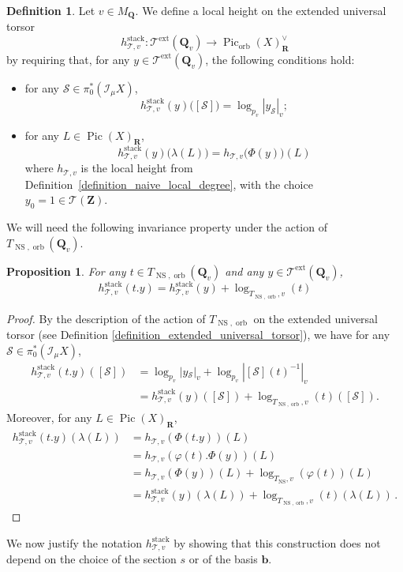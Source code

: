\documentclass{proc-l}
\newcommand{\R}{\mathbf{R}}
\newcommand{\Z}{\mathbf{Z}}
\newcommand{\Q}{\mathbf{Q}}
\newcommand{\base}{\mathbf{b}}
\DeclareMathOperator{\Pic}{Pic}
\DeclareMathOperator{\stack}{stack}
\DeclareMathOperator{\NS}{NS}
\DeclareMathOperator{\orb}{orb}
\DeclareMathOperator{\ext}{ext}
\newcommand{\stackS}{\mathcal{S}}
\newcommand{\stackT}{\mathcal{T}}
\newcommand{\sheafI}{\mathcal{I}}
\newcommand{\twistsector}{\pi_0^*(\sheafI_{\mu} X)}
\newtheorem{prop}[theorem]{Proposition}
\theoremstyle{definition}
\newtheorem{definition}[theorem]{Definition}
\theoremstyle{remark}
\numberwithin{equation}{section}
\begin{document}
\begin{definition}\label{definition_lift_free_picard_stacky_height}
Let $v \in M_{\Q}$. We define a local height on the extended universal torsor
\[
h_{\stackT,v}^{\stack} : \stackT^{\ext}(\Q_v) \longrightarrow \Pic_{\orb}(X)^{\vee}_{\R}
\]
by requiring that, for any $y \in \stackT^{\ext}(\Q_v)$, the following conditions hold:
\begin{itemize}
\item
for any $\stackS \in \twistsector$,
\[
h_{\stackT,v}^{\stack}(y)\bigl([\stackS]\bigr)
=
\log_{p_v} \left| y_{\stackS} \right|_v;
\]
\item
for any $L \in \Pic(X)_{\R}$,
\[
h_{\stackT,v}^{\stack}(y)\bigl(\lambda(L)\bigr)
=
h_{\stackT,v}\bigl(\Phi(y)\bigr)(L)
\]where $h_{\stackT,v}$ is the local height from Definition~\ref{definition_naive_local_degree}, with the choice \\ $y_0 = 1 \in \stackT(\Z)$.
\end{itemize}
\end{definition}

We will need the following invariance property under the action of $T_{\NS,\orb}(\Q_v)$.

\begin{prop}\label{proposition_appendix_B_property_equivariant_extended_height}
    For any $t \in T_{\NS,\orb}(\Q_v)$ and any $y \in \stackT^{\ext}(\Q_v)$, $$h_{\stackT,v}^{\stack}(t.y) = h_{\stackT,v}^{\stack}\left(y\right) + \log_{T_{\NS,\orb},v}(t)$$
\end{prop}


\begin{proof}
    By the description of the action of $T_{\NS,\orb}$ on the extended universal torsor (see Definition \ref{definition_extended_universal_torsor}), we have for any $\stackS \in \twistsector$,
    \begin{align*}
        h_{\stackT,v}^{\stack}(t.y)([\stackS]) &=  \log_{p_v} | y{}_{\stackS} |_v + \log_{p_v} |[\stackS](t)^{-1}|_v \\
        &= h_{\stackT,v}^{\stack}\left(y\right)([\stackS]) + \log_{T_{\NS,\orb},v}(t)([\stackS]).
    \end{align*}
    Moreover, for any $L \in \Pic(X)_{\R}$,
    \begin{align*}
        h_{\stackT,v}^{\stack}(t.y)(\lambda(L)) &= h_{\stackT,v}(\Phi(t.y))(L) \\
        &= h_{\stackT,v}\left(\varphi(t).\Phi(y)\right)(L)  \\
        &= h_{\stackT,v}\left(\Phi(y)\right)(L) + \log_{T_{\NS},v}(\varphi(t))(L) \\
        &= h_{\stackT,v}^{\stack}\left(y\right)(\lambda(L)) + \log_{T_{\NS,\orb},v}(t)(\lambda(L)) \, .
    \end{align*}
\end{proof}
We now justify the notation $h_{\stackT,v}^{\stack}$ by showing that this construction does not depend on the choice of the section $s$ or of the basis $\base$.
\end{document}
